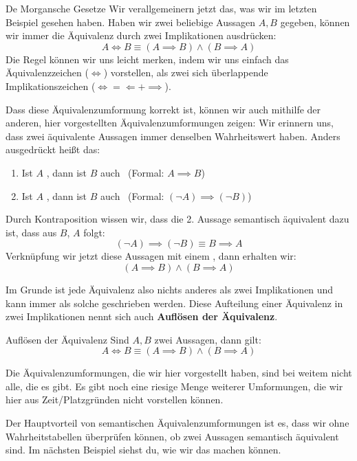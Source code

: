 \documentclass[../../main.tex]{subfiles}
\begin{document}
\begin{lemma}{De Morgansche Gesetze}
    Wir verallgemeinern jetzt das, was wir im letzten Beispiel gesehen haben.
     Haben wir zwei beliebige Aussagen $A,B$ gegeben, können wir immer die Äquivalenz
     durch zwei Implikationen ausdrücken:
    \[A \iff B \equiv (A \implies B) \land (B \implies A)\]
    Die Regel können wir uns leicht merken, indem wir uns einfach das Äquivalenzzeichen
    ($\iff$) vorstellen, als zwei sich überlappende Implikationszeichen ($\iff = \Longleftarrow + \implies$).

    Dass diese Äquivalenzumformung korrekt ist, können wir auch mithilfe der anderen, hier vorgestellten Äquivalenzumformungen 
    zeigen: Wir erinnern uns, dass zwei äquivalente Aussagen 
    immer denselben Wahrheitswert haben. Anders ausgedrückt heißt das:
    \begin{enumerate}
        \item Ist $A$ \wahr, dann ist $B$ auch \wahr\  (Formal: $A \implies B$)
        \item Ist $A$ \falsch, dann ist $B$ auch \falsch\  (Formal: $(\lnot A) \implies (\lnot B)$)
    \end{enumerate}
    Durch Kontraposition wissen wir, dass die 2. Aussage semantisch äquivalent dazu ist,
    dass aus $B$, $A$ folgt:
    \[(\lnot A) \implies (\lnot B) \equiv B \implies A\]
    Verknüpfung wir jetzt diese Aussagen mit einem , dann erhalten wir:
    \[(A \implies B) \land (B \implies A)\]
    
    Im Grunde ist jede Äquivalenz also nichts anderes als zwei Implikationen und kann immer als solche geschrieben werden. 
    Diese Aufteilung einer Äquivalenz in zwei Implikationen nennt sich auch \textbf{Auflösen der Äquivalenz}.
    
    \begin{theorem}{Auflösen der Äquivalenz}
    Sind $A,B$ zwei Aussagen, dann gilt:
        \[ A \iff B \equiv (A \implies B) \land (B \implies A)\]
    \end{theorem}

    Die Äquivalenzumformungen, die wir hier vorgestellt haben, sind bei weitem nicht alle, die es gibt. Es gibt
    noch eine riesige Menge weiterer Umformungen, die wir hier aus Zeit/Platzgründen nicht vorstellen können.
    
    Der Hauptvorteil von semantischen Äquivalenzumformungen ist es, dass wir ohne
    Wahrheitstabellen überprüfen können, ob zwei Aussagen semantisch äquivalent sind. 
    Im nächsten Beispiel siehst du, wie wir das machen können.


\end{lemma}
\end{document}
